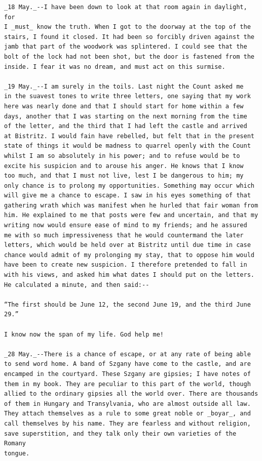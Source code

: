 \documentclass{article}
\begin{document}
\begin{verbatim}
_18 May._--I have been down to look at that room again in daylight, for
I _must_ know the truth. When I got to the doorway at the top of the
stairs, I found it closed. It had been so forcibly driven against the
jamb that part of the woodwork was splintered. I could see that the
bolt of the lock had not been shot, but the door is fastened from the
inside. I fear it was no dream, and must act on this surmise.

_19 May._--I am surely in the toils. Last night the Count asked me
in the suavest tones to write three letters, one saying that my work
here was nearly done and that I should start for home within a few
days, another that I was starting on the next morning from the time
of the letter, and the third that I had left the castle and arrived
at Bistritz. I would fain have rebelled, but felt that in the present
state of things it would be madness to quarrel openly with the Count
whilst I am so absolutely in his power; and to refuse would be to
excite his suspicion and to arouse his anger. He knows that I know
too much, and that I must not live, lest I be dangerous to him; my
only chance is to prolong my opportunities. Something may occur which
will give me a chance to escape. I saw in his eyes something of that
gathering wrath which was manifest when he hurled that fair woman from
him. He explained to me that posts were few and uncertain, and that my
writing now would ensure ease of mind to my friends; and he assured
me with so much impressiveness that he would countermand the later
letters, which would be held over at Bistritz until due time in case
chance would admit of my prolonging my stay, that to oppose him would
have been to create new suspicion. I therefore pretended to fall in
with his views, and asked him what dates I should put on the letters.
He calculated a minute, and then said:--

“The first should be June 12, the second June 19, and the third June
29.”

I know now the span of my life. God help me!

_28 May._--There is a chance of escape, or at any rate of being able
to send word home. A band of Szgany have come to the castle, and are
encamped in the courtyard. These Szgany are gipsies; I have notes of
them in my book. They are peculiar to this part of the world, though
allied to the ordinary gipsies all the world over. There are thousands
of them in Hungary and Transylvania, who are almost outside all law.
They attach themselves as a rule to some great noble or _boyar_, and
call themselves by his name. They are fearless and without religion,
save superstition, and they talk only their own varieties of the Romany
tongue.


\end{verbatim}
\end{document}
